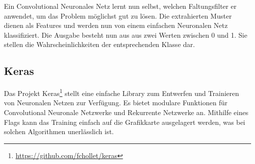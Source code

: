 Ein Convolutional Neuronales Netz lernt nun selbst, welchen Faltungsfilter er anwendet, um das Problem möglichst gut zu lösen. Die extrahierten Muster dienen als Features und werden nun von einem einfachen Neuronalen Netz klassifiziert. Die Ausgabe besteht nun aus aus zwei Werten zwischen 0 und 1. Sie stellen die Wahrscheinlichkeiten der entsprechenden Klasse dar.

\subsection{Keras}
Das Projekt Keras\footnote{\url{https://github.com/fchollet/keras}} stellt eine einfache Library zum Entwerfen und Trainieren von Neuronalen Netzen zur Verfügung. Es bietet modulare Funktionen für Convolutional Neuronale Netzwerke und Rekurrente Netzwerke an. Mithilfe eines Flags kann das Training einfach auf die Grafikkarte ausgelagert werden, was bei solchen Algorithmen unerlässlich ist.